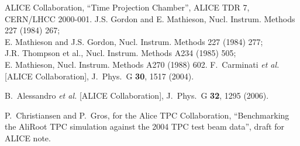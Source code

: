 \documentclass[a4paper,12pt]{article}
\begin{document}
\begin{thebibliography}{9}
  
 ALICE Collaboration, ``Time Projection Chamber'',
  ALICE TDR 7, CERN/LHCC 2000-001.
 J.S. Gordon and E. Mathieson, Nucl. Instrum. Methods 227 
(1984) 267;\\
E. Mathieson and J.S. Gordon, Nucl. Instrum. Methods 227 (1984) 277;\\
J.R. Thompson et al., Nucl. Instrum. Methods A234 (1985) 505; \\
E. Mathieson, Nucl. Instrum. Methods A270 (1988) 602.
  F.~Carminati {\it et al.}  [ALICE Collaboration],
  J.\ Phys.\ G {\bf 30}, 1517 (2004).

  B.~Alessandro {\it et al.}  [ALICE Collaboration],
  J.\ Phys.\ G {\bf 32}, 1295 (2006).

 P.~Christiansen and P.~Gros, for the Alice TPC
  Collaboration, ``Benchmarking the AliRoot TPC simulation against the
  2004 TPC test beam data'', draft for ALICE note.

\end{thebibliography}
\end{document}
